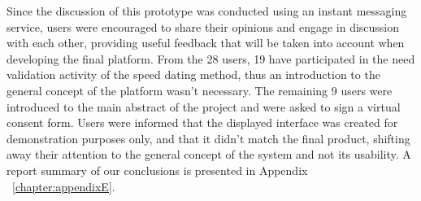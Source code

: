 {{Since the discussion of this prototype was conducted using an instant messaging service, users were encouraged to share their opinions and engage in discussion with each other, providing useful feedback that will be taken into account when developing the final platform. From the 28 users, 19 have participated in the need validation activity of the speed dating method, thus an introduction to the general concept of the platform wasn't necessary. The remaining 9 users were introduced to the main abstract of the project and were asked to sign a virtual consent form. Users were informed that the displayed interface was created for demonstration purposes only, and that it didn't match the final product, shifting away their attention to the general concept of the system and not its usability. A report summary of our conclusions is presented in Appendix ~\ref{chapter:appendixE}.


}}

